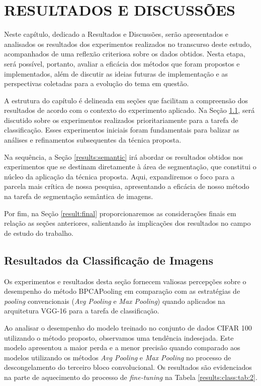 \newpage
\clearpage

\section{RESULTADOS E DISCUSSÕES}
\label{results}
Neste capítulo, dedicado a Resultados e Discussões, serão apresentados e analisados os resultados dos experimentos realizados no transcurso deste estudo, acompanhados de uma reflexão criteriosa sobre os dados obtidos. Nesta etapa, será possível, portanto, avaliar a eficácia dos métodos que foram propostos e implementados, além de discutir as ideias futuras de implementação e as perspectivas coletadas para a evolução do tema em questão.

A estrutura do capítulo é delineada em seções que facilitam a compreensão dos resultados de acordo com o contexto do experimento aplicado. Na Seção \ref{results:class}, será discutido sobre os experimentos realizados prioritariamente para a tarefa de classificação. Esses experimentos iniciais foram fundamentais para balizar as análises e refinamentos subsequentes da técnica proposta.

Na sequência, a Seção \ref{results:semantic} irá abordar os resultados obtidos nos experimentos que se destinam diretamente à área de segmentação, que constitui o núcleo da aplicação da técnica proposta. Aqui, expandiremos o foco para a parcela mais crítica de nossa pesquisa, apresentando a eficácia de nosso método na tarefa de segmentação semântica de imagens.

Por fim, na Seção \ref{result:final} proporcionaremos as considerações finais em relação as seções anteriores, salientando às implicações dos resultados no campo de estudo do trabalho.

\subsection{Resultados da Classificação de Imagens}
\label{results:class}
Os experimentos e resultados desta seção fornecem valiosas percepções sobre o desempenho do método BPCAPooling em comparação com as estratégias de \textit{pooling} convencionais (\textit{Avg Pooling} e \textit{Max Pooling}) \citep{Ozdemir2023Avg-topk:Networks} quando aplicados na arquitetura VGG-16 para a tarefa de classificação.

Ao analisar o desempenho do modelo treinado no conjunto de dados CIFAR 100 utilizando o método proposto, observamos uma tendência indesejada. Este modelo apresentou a maior perda e a menor precisão quando comparado aos modelos utilizando os métodos \textit{Avg Pooling} e \textit{Max Pooling} no processo de descongelamento do terceiro bloco convolucional. Os resultados são evidenciados na parte de aquecimento do processo de \textit{fine-tuning} na Tabela \ref{results:class:tab:2}.

